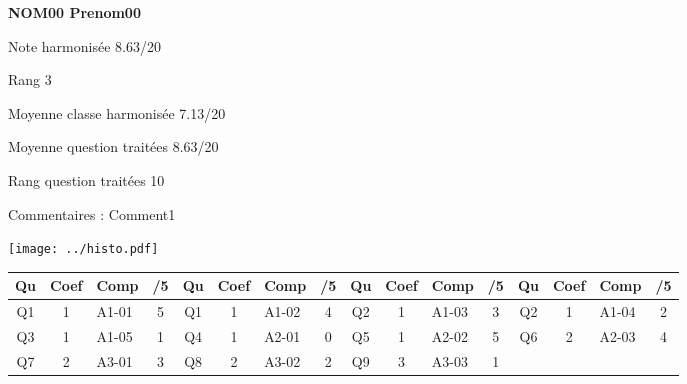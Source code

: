 \begin{minipage}[c]{.45\linewidth} 
\Large \textbf{\textsf{NOM00 Prenom00}} 
 
 \normalsize Note harmonisée 8.63/20 
 
Rang 3
 
Moyenne classe harmonisée 7.13/20 
 
Moyenne question traitées 8.63/20 
 
Rang question traitées 10 
 
Commentaires : 
Comment1 
\end{minipage}\hfill 
\begin{minipage}[c]{.45\linewidth}  
\begin{center}
\texttt{[image: ../histo.pdf]} 
\end{center}
\end{minipage}
\footnotesize 
\begin{center} 
\begin{tabular}{|c|c|m{1cm}|c||c|c|m{1cm}|c||c|c|m{1cm}|c||c|c|m{1cm}|c|} 
\hline \textbf{Qu} & \textbf{Coef} & \textbf{Comp} & \textbf{/5} & \textbf{Qu} & \textbf{Coef} & \textbf{Comp} & \textbf{/5} & \textbf{Qu} & \textbf{Coef} & \textbf{Comp} & \textbf{/5} & \textbf{Qu} & \textbf{Coef} & \textbf{Comp} & \textbf{/5} \\ 
\hline 
\hline 
Q1 & 1 & A1-01 & 5 & Q1 & 1 & A1-02 & 4 & Q2 & 1 & A1-03 & 3 & Q2 & 1 & A1-04 & 2 \\ \hline 
 
Q3 & 1 & A1-05 & 1 & Q4 & 1 & A2-01 & 0 & Q5 & 1 & A2-02 & 5 & Q6 & 2 & A2-03 & 4 \\ \hline 
 
Q7 & 2 & A3-01 & 3 & Q8 & 2 & A3-02 & 2 & Q9 & 3 & A3-03 & 1 &  &  &  &  \\ \hline 
 
\end{tabular} 
\end{center} 
\normalsize 
 
